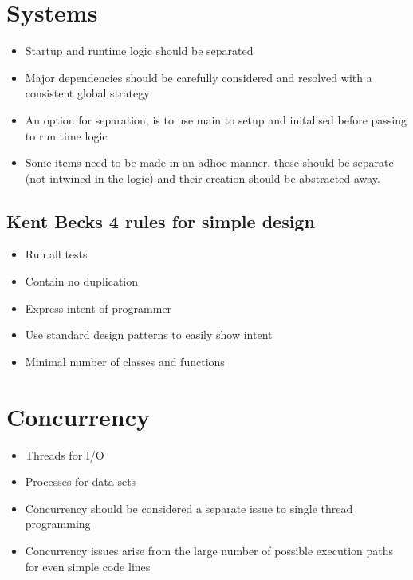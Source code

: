 \documentclass[11pt]{scrartcl} %
\begin{document}
\section{Systems}

\begin{itemize}
	
	\item Startup and runtime logic should be separated
	\item Major dependencies should be carefully considered and resolved with a consistent global strategy
	\item An option for separation, is to use main to setup and initalised before passing to run time logic
	\item Some items need to be made in an adhoc manner, these should be separate (not intwined in the logic) 
	and their creation should be abstracted away.
	  
\end{itemize}

\subsection{Kent Becks 4 rules for simple design}
\begin{itemize}
	\item Run all tests
	\item Contain no duplication
	\item Express intent of programmer
	\item Use standard design patterns to easily show intent
	\item Minimal number of classes and functions
\end{itemize}

\section{Concurrency}

\begin{itemize}
	\item Threads for I/O
	\item Processes for data sets
	
	\item Concurrency should be considered a separate issue to single thread programming 
	\item Concurrency issues arise from the large number of possible execution paths for even simple code lines
\end{itemize}
\end{document}
